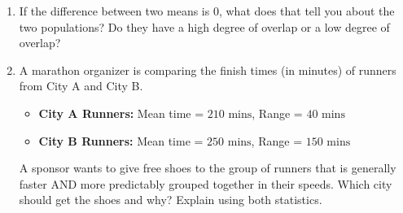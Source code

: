 \documentclass[12pt, letterpaper, fleqn]{article}
\begin{document}
\vspace{3mm}

\begin{enumerate}[itemsep=5.5cm, leftmargin=0.6cm, resume]
\item If the difference between two means is $0$, what does that tell you about the two populations? Do they have a high degree of overlap or a low degree of overlap?
\item A marathon organizer is comparing the finish times (in minutes) of runners from City A and City B.
\begin{itemize}
\item \textbf{City A Runners:} Mean time = $210\text{ mins}$, Range = $40\text{ mins}$
\item \textbf{City B Runners:} Mean time = $250\text{ mins}$, Range = $150\text{ mins}$
\end{itemize}
A sponsor wants to give free shoes to the group of runners that is generally faster AND more predictably grouped together in their speeds. Which city should get the shoes and why? Explain using both statistics.
\end{enumerate}
\end{document}
